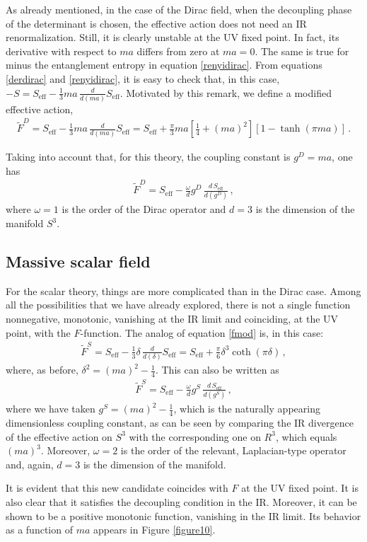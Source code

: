 \documentclass[12pt,a4paper]{article}
\newcommand{\beq}{\begin{eqnarray}}
\newcommand{\eeq}{\end{eqnarray}}
\numberwithin{equation}{section}
\begin{document}
As already mentioned, in the case of the Dirac field, when the decoupling phase of the determinant is chosen, the effective action does not need an IR renormalization. Still, it is clearly unstable at the UV fixed point. In fact, its derivative with respect to $ma$ differs from zero at $ma=0$. The same is true for minus the entanglement entropy in equation \eqref{renyidirac}. From equations \eqref{derdirac} and \eqref{renyidirac}, it is easy to check that, in this case, $-S=S_{\mathrm{eff}}-\frac13 ma\,\frac{d}{d(ma)}S_{\mathrm{eff}}$. Motivated by this remark, we define a modified effective action,
\beq
\tilde{F}^D=S_{\mathrm{eff}}-\frac13 ma\,\frac{d}{d(ma)}S_{\mathrm{eff}}=S_{\mathrm{eff}}+\frac{\pi}{3} ma \left[\frac14 +(ma)^2\right]\left[1-\tanh(\pi m a)\right]\,.\eeq

Taking into account that, for this theory, the coupling constant is $g^{D}=ma$, one has
\beq
{\tilde{F}^D}= S_{\mathrm{eff}}-\frac{\omega}{d} g^{D}\,\frac{d\,S_{\mathrm{eff}}}{d(g^{D})}\,,\label{fmod}\eeq
where $\omega=1$ is the order of the Dirac operator and $d=3$ is the dimension of the manifold $S^3$.

\subsection{Massive scalar field}

For the scalar theory, things are more complicated than in the Dirac case. Among all the possibilities that we have already explored, there is not a single function nonnegative, monotonic, vanishing at the IR limit and coinciding, at the UV point, with the $F$-function. The analog of equation \eqref{fmod} is, in this case:
\beq
{\tilde{F}}^{S}=S_{\mathrm{eff}}-\frac13 \delta\,\frac{d}{d(\delta)}S_{\mathrm{eff}}=S_{\mathrm{eff}}+\frac{\pi}{6}{\delta}^3 \coth(\pi \delta)\,,\eeq
where, as before, ${\delta}^2=(ma)^2 -\frac14$.
This can also be written as
\beq
\tilde{F}^{S}=S_{\mathrm{eff}}-\frac{\omega}{d} g^{S}\,\frac{d\,S_{\mathrm{eff}}}{d(g^{S})}\,,\eeq
where we have taken $g^{S}=(ma)^2 -\frac14$, which is the naturally appearing dimensionless coupling constant, as can be seen by comparing the IR divergence of the effective action on $S^3$ with the corresponding one on $R^3$, which equals ${(ma)}^3$. Moreover, $\omega=2$ is the order of the relevant, Laplacian-type operator and, again, $d=3$ is the dimension of the manifold.

It is evident that this new candidate coincides with $F$ at the UV fixed point. It is also clear that it satisfies the decoupling condition in the IR. Moreover, it can be shown to be a positive monotonic function, vanishing in the IR limit. Its behavior as a function of $ma$ appears in Figure \ref{figure10}.
\end{document}

